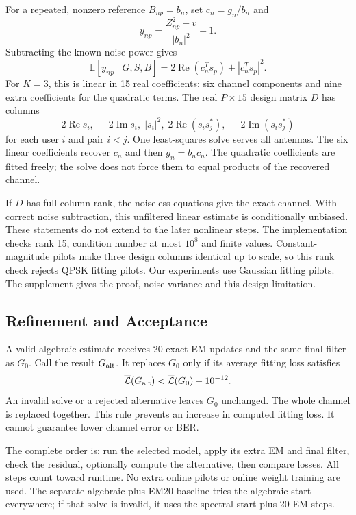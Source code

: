 For a repeated, nonzero reference $B_{np}=b_n$, set $c_n=g_n/b_n$ and
\begin{equation}
 y_{np}=\frac{Z_{np}^2-v}{|b_n|^2}-1.
\end{equation}
Subtracting the known noise power gives
\begin{equation}
 \mathbb E[y_{np}\mid G,S,B]
 =2\operatorname{Re}(c_n^Ts_p)+|c_n^Ts_p|^2.
 \label{eq:intensity}
\end{equation}
For $K=3$, this is linear in 15 real coefficients: six channel components and nine extra coefficients for the quadratic terms. The real $P\times15$ design matrix $D$ has columns
\begin{equation}
 2\operatorname{Re}s_i,\;-2\operatorname{Im}s_i,\;|s_i|^2,\;
 2\operatorname{Re}(s_is_j^*),\;-2\operatorname{Im}(s_is_j^*)
\end{equation}
for each user $i$ and pair $i<j$. One least-squares solve serves all antennas. The six linear coefficients recover $c_n$ and then $g_n=b_nc_n$. The quadratic coefficients are fitted freely; the solve does not force them to equal products of the recovered channel.

If $D$ has full column rank, the noiseless equations give the exact channel. With correct noise subtraction, this unfiltered linear estimate is conditionally unbiased. These statements do not extend to the later nonlinear steps. The implementation checks rank 15, condition number at most $10^8$ and finite values. Constant-magnitude pilots make three design columns identical up to scale, so this rank check rejects QPSK fitting pilots. Our experiments use Gaussian fitting pilots. The supplement gives the proof, noise variance and this design limitation.

\subsection{Refinement and Acceptance}
A valid algebraic estimate receives 20 exact EM updates and the same final filter as $G_0$. Call the result $G_{\rm alt}$. It replaces $G_0$ only if its average fitting loss satisfies
\begin{equation}
 \overline{\mathcal L}(G_{\rm alt})<
 \overline{\mathcal L}(G_0)-10^{-12}.
 \label{eq:accept}
\end{equation}
An invalid solve or a rejected alternative leaves $G_0$ unchanged. The whole channel is replaced together. This rule prevents an increase in computed fitting loss. It cannot guarantee lower channel error or BER.

The complete order is: run the selected model, apply its extra EM and final filter, check the residual, optionally compute the alternative, then compare losses. All steps count toward runtime. No extra online pilots or online weight training are used. The separate algebraic-plus-EM20 baseline tries the algebraic start everywhere; if that solve is invalid, it uses the spectral start plus 20 EM steps.
